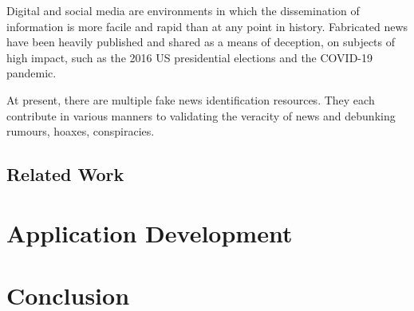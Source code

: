\documentclass[12pt, a4paper]{article}
\begin{document}
  Digital and social media are environments in which the dissemination of information is more facile and rapid than at any point in history. Fabricated news have been heavily published and shared as a means of deception, on subjects of high impact, such as the 2016 US presidential elections and the COVID-19 pandemic.

  At present, there are multiple fake news identification resources. They each contribute in various manners to validating the veracity of news and debunking rumours, hoaxes, conspiracies.


  \subsection{Related Work}
  \newpage


  \section{Application Development}
  
  \section{Conclusion}
  \newpage

  
  
  \nocite{*}
\end{document}
